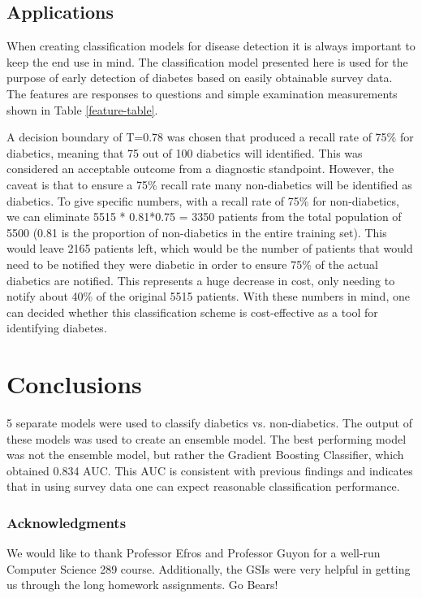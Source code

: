 \documentclass{article} %
\begin{document}
\subsection{Applications} 
When creating classification models for disease detection it is always important to keep the end use in mind. The classification model presented here is used for the purpose of early detection of diabetes based on easily obtainable survey data. The features are responses to questions and simple examination measurements shown in Table \ref{feature-table}. 

A decision boundary of T=0.78 was chosen that produced a recall rate of 75\% for diabetics, meaning that 75 out of 100 diabetics will identified. This was considered an acceptable outcome from a diagnostic standpoint. However, the caveat is that to ensure a 75\% recall rate many non-diabetics will be identified as diabetics. To give specific numbers, with a recall rate of 75\% for non-diabetics, we can eliminate 5515 * 0.81*0.75 = 3350 patients from the total population of 5500 (0.81 is the proportion of non-diabetics in the entire training set).  This would leave 2165 patients left, which would be the number of patients that would need to be notified they were diabetic in order to ensure 75\% of the actual diabetics are notified. This represents a huge decrease in cost, only needing to notify about 40\% of the original 5515 patients. With these numbers in mind, one can decided whether this classification scheme is cost-effective as a tool for identifying diabetes.
  
\section{Conclusions}
5 separate models were used to classify diabetics vs. non-diabetics. The output of these models was used to create an ensemble model. The best performing model was not the ensemble model, but rather the Gradient Boosting Classifier, which obtained 0.834 AUC. This AUC is consistent with previous findings and indicates that in using survey data one can expect reasonable classification performance. 

\subsubsection*{Acknowledgments}
We would like to thank Professor Efros and Professor Guyon for a well-run Computer Science 289 course. Additionally, the GSIs were very helpful in getting us through the long homework assignments. Go Bears!



\end{document}
